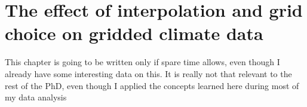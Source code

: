 \chapter{The effect of interpolation and grid choice on gridded climate data}
This chapter is going to be written only if spare time allows, even though I already have some interesting data on this. It is really not that relevant to the rest of the PhD, even though I applied the concepts learned here during most of my data analysis